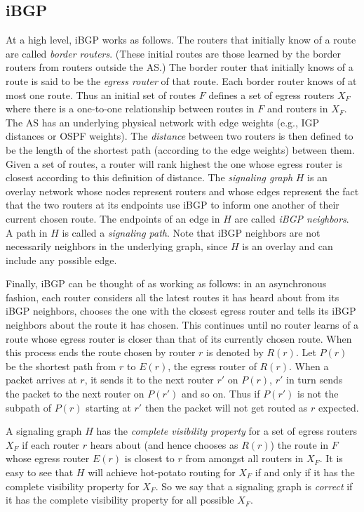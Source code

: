 \documentclass[11pt,letterpaper]{article}
\theoremstyle{definition}
\newcounter{note}[section]
\begin{document}
\subsection{iBGP}
At a high level, iBGP works as follows.
The routers that initially know of a route are called {\em border routers}.
(These initial routes are those learned by the border routers from
routers outside the AS.)
The border router that initially knows of a route
is said to be the {\em egress router} of that route.
Each border router knows of at most one route.
Thus an initial set of routes $F$ defines a set of egress routers $X_F$ where
there is a one-to-one relationship between routes in $F$ and routers
in $X_F$.
The AS has an underlying physical network with edge weights (e.g., IGP
distances or OSPF weights).
The {\em distance} between two routers is then defined to be the
length of the shortest path (according to the edge weights) between them.
Given a set of routes, a router will rank highest the one whose
egress router is closest according to this definition of distance.
The {\em signaling graph} $H$ is an overlay network whose nodes represent
routers and whose edges represent the fact that
the two routers at its endpoints use iBGP to inform one another of
their current chosen route.
The endpoints of an edge in $H$ are called {\em iBGP neighbors}.
A path in $H$ is called a {\em signaling path}.  Note that iBGP neighbors are not necessarily neighbors in the underlying graph, since $H$ is an overlay and can include any possible edge.

Finally, iBGP can be thought of as working as follows:
in an asynchronous fashion, each router considers all the latest routes
it has heard about from its iBGP neighbors,
chooses the one with the closest egress router and tells its
iBGP neighbors about the route it has chosen.
This continues until no router learns of a route whose egress router is
closer than that of its currently chosen route.
When this process ends the route chosen by router $r$ is denoted by $R(r)$.
Let $P(r)$ be
the shortest path from $r$ to $E(r)$, the egress router of $R(r)$.
When a packet arrives at $r$, it sends it to the next router $r'$ on $P(r)$,
$r'$ in turn sends the packet to the next router on $P(r')$ and so on.
Thus if $P(r')$ is not the subpath of $P(r)$ starting at $r'$ then the
packet will not get routed as $r$ expected.

A signaling graph $H$ has the \emph{complete visibility property} for a set of egress routers $X_F$ if each router $r$ hears about (and hence
chooses as $R(r)$) the route in $F$ whose egress router $E(r)$ is closest to
$r$ from amongst all routers in $X_F$.  It is easy to see that $H$ will achieve hot-potato routing for $X_F$ if and only if it has the complete visibility property for $X_F$.  So we say that a signaling graph is \emph{correct} if it has the complete visibility property for all possible $X_F$.
\end{document}
